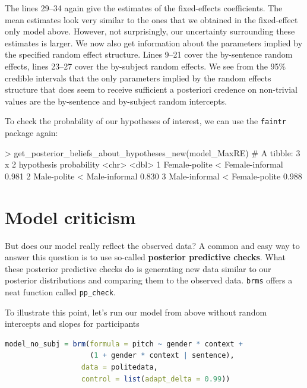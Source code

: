 \documentclass[nobib]{tufte-handout}
\begin{document}
The lines 29--34 again give the estimates of the fixed-effects coefficients. The mean estimates look very similar to the ones that we obtained in the fixed-effect only model above. However, not surprisingly, our uncertainty surrounding these estimates is larger.  
We now also get information about the parameters implied by the specified random effect
structure. Lines 9--21 cover the by-sentence random effects, lines 23--27 cover the by-subject
random effects. We see from the 95\% credible intervals that the only parameters implied by the
random effects structure that does seem to receive sufficient a posteriori credence on
non-trivial values are the by-sentence and by-subject random intercepts.

To check the probability of our hypotheses of interest, we can use the \texttt{faintr} package again:

\medskip

\begin{minipage}[]{\textwidth}
\begin{rc}
> get_posterior_beliefs_about_hypotheses_new(model_MaxRE)
# A tibble: 3 x 2
  hypothesis                      probability
  <chr>                                 <dbl>
1 Female-polite < Female-informal       0.981
2 Male-polite < Male-informal           0.830
3 Male-informal < Female-polite         0.988
\end{rc}
\end{minipage}

\section{Model criticism}
But does our model really reflect the observed data? A common and easy way to answer this question is to use so-called \textbf{posterior predictive checks}. What these posterior predictive checks do is generating new data similar to our posterior distributions and comparing them to the observed data. \texttt{brms} offers a neat function called \texttt{pp\_check}. 

To illustrate this point, let's run our model from above without random intercepts and slopes for participants 

\begin{minipage}[]{1\textwidth}
\begin{lstlisting}[language=R]
model_no_subj = brm(formula = pitch ~ gender * context +
                    (1 + gender * context | sentence),
                  data = politedata,
                  control = list(adapt_delta = 0.99))
\end{lstlisting}
\end{minipage}
\end{document}
